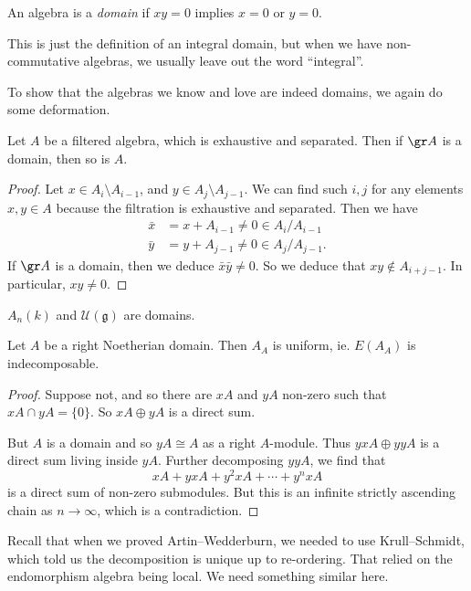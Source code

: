 \documentclass[a4paper]{article}
\begin{document}
\begin{defi}[Domain]
  An algebra is a \emph{domain} if $xy = 0$ implies $x = 0$ or $y = 0$.
\end{defi}
This is just the definition of an integral domain, but when we have non-commutative algebras, we usually leave out the word ``integral''.

To show that the algebras we know and love are indeed domains, we again do some deformation.
\begin{lemma}
  Let $A$ be a filtered algebra, which is exhaustive and separated. Then if $\gr A$ is a domain, then so is $A$.
\end{lemma}

\begin{proof}
  Let $x \in A_i \setminus A_{i - 1}$, and $y \in A_j \setminus A_{j - 1}$. We can find such $i, j$ for any elements $x, y \in A$ because the filtration is exhaustive and separated. Then we have
  \begin{align*}
    \bar{x} &= x + A_{i - 1} \not= 0 \in A_i/A_{i - 1}\\
    \bar{y} &= y + A_{j - 1} \not= 0 \in A_j/A_{j - 1}.
  \end{align*}
  If $\gr A$ is a domain, then we deduce $\bar{x}\bar{y} \not= 0$. So we deduce that $xy \not \in A_{i + j - 1}$. In particular, $xy \not = 0$.
\end{proof}

\begin{cor}
  $A_n(k)$ and $\mathcal{U}(\mathfrak{g})$ are domains.
\end{cor}

\begin{lemma}
  Let $A$ be a right Noetherian domain. Then $A_A$ is uniform, ie. $E(A_A)$ is indecomposable.
\end{lemma}

\begin{proof}
  Suppose not, and so there are $xA$ and $yA$ non-zero such that $xA \cap yA = \{0\}$. So $xA \oplus yA$ is a direct sum.

  But $A$ is a domain and so $yA \cong A$ as a right $A$-module. Thus $yxA \oplus yyA$ is a direct sum living inside $yA$. Further decomposing $yyA$, we find that
  \[
    xA + yx A + y^2 xA + \cdots + y^n xA
  \]
  is a direct sum of non-zero submodules. But this is an infinite strictly ascending chain as $n \to \infty$, which is a contradiction.
\end{proof}

Recall that when we proved Artin--Wedderburn, we needed to use Krull--Schmidt, which told us the decomposition is unique up to re-ordering. That relied on the endomorphism algebra being local. We need something similar here.
\end{document}

